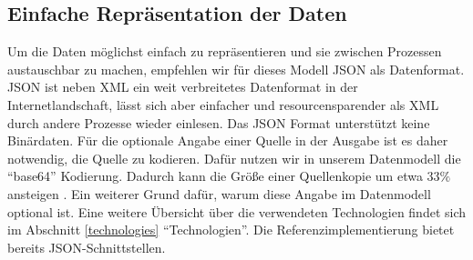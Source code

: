 \subsection{Einfache Repräsentation der Daten}
Um die Daten möglichst einfach zu repräsentieren und sie zwischen Prozessen austauschbar zu machen, empfehlen wir für dieses Modell JSON als Datenformat. JSON ist neben XML ein weit verbreitetes Datenformat in der Internetlandschaft, lässt sich aber einfacher und resourcensparender als XML durch andere Prozesse wieder einlesen. Das JSON Format unterstützt keine Binärdaten. Für die optionale Angabe einer Quelle in der Ausgabe ist es daher notwendig, die Quelle zu kodieren. Dafür nutzen wir in unserem Datenmodell die ``base64'' Kodierung. Dadurch kann die Größe einer Quellenkopie um etwa $33\%$ ansteigen \cite{ng2005study}. Ein weiterer Grund dafür, warum diese Angabe im Datenmodell optional ist. Eine weitere Übersicht über die verwendeten Technologien findet sich im Abschnitt \ref{technologies} ``Technologien''. Die Referenzimplementierung bietet bereits JSON-Schnittstellen.
